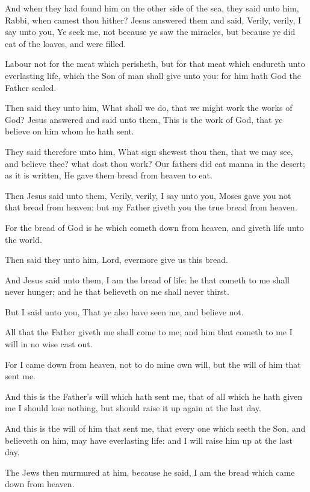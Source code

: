 \Verse And when they had found him on the other side of the sea, they said unto him, Rabbi, when camest thou hither?  \Verse Jesus answered them and said, Verily, verily, I say unto you, Ye seek me, not because ye saw the miracles, but because ye did eat of the loaves, and were filled.

\Verse Labour not for the meat which perisheth, but for that meat which endureth unto everlasting life, which the Son of man shall give unto you: for him hath God the Father sealed.

\Verse Then said they unto him, What shall we do, that we might work the works of God?  \Verse Jesus answered and said unto them, This is the work of God, that ye believe on him whom he hath sent.

\Verse They said therefore unto him, What sign shewest thou then, that we may see, and believe thee? what dost thou work?  \Verse Our fathers did eat manna in the desert; as it is written, He gave them bread from heaven to eat.

\Verse Then Jesus said unto them, Verily, verily, I say unto you, Moses gave you not that bread from heaven; but my Father giveth you the true bread from heaven.

\Verse For the bread of God is he which cometh down from heaven, and giveth life unto the world.

\Verse Then said they unto him, Lord, evermore give us this bread.

\Verse And Jesus said unto them, I am the bread of life: he that cometh to me shall never hunger; and he that believeth on me shall never thirst.

\Verse But I said unto you, That ye also have seen me, and believe not.

\Verse All that the Father giveth me shall come to me; and him that cometh to me I will in no wise cast out.

\Verse For I came down from heaven, not to do mine own will, but the will of him that sent me.

\Verse And this is the Father's will which hath sent me, that of all which he hath given me I should lose nothing, but should raise it up again at the last day.

\Verse And this is the will of him that sent me, that every one which seeth the Son, and believeth on him, may have everlasting life: and I will raise him up at the last day.

\Verse The Jews then murmured at him, because he said, I am the bread which came down from heaven.

